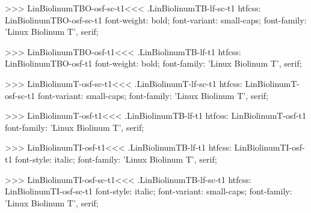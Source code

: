 {{{{{{{>>>
\<LinBiolinumTBO-osf-sc-t1\><<<
.LinBiolinumTB-lf-sc-t1
htfcss:  LinBiolinumTBO-osf-sc-t1  font-weight: bold; font-variant: small-caps; font-family: 'Linux Biolinum T', serif;

>>>
\<LinBiolinumTBO-osf-t1\><<<
.LinBiolinumTB-lf-t1
htfcss:  LinBiolinumTBO-osf-t1  font-weight: bold; font-family: 'Linux Biolinum T', serif;

>>>
\<LinBiolinumT-osf-sc-t1\><<<
.LinBiolinumT-lf-sc-t1
htfcss:  LinBiolinumT-osf-sc-t1  font-variant: small-caps; font-family: 'Linux Biolinum T', serif;

>>>
\<LinBiolinumT-osf-t1\><<<
.LinBiolinumTB-lf-t1
htfcss:  LinBiolinumT-osf-t1  font-family: 'Linux Biolinum T', serif;

>>>
\<LinBiolinumTI-osf-t1\><<<
.LinBiolinumTB-lf-t1
htfcss:  LinBiolinumTI-osf-t1  font-style: italic; font-family: 'Linux Biolinum T', serif;

>>>
\<LinBiolinumTI-osf-sc-t1\><<<
.LinBiolinumTB-lf-sc-t1
htfcss:  LinBiolinumTI-osf-sc-t1  font-style: italic; font-variant: small-caps; font-family: 'Linux Biolinum T', serif;

}}}}}}}
